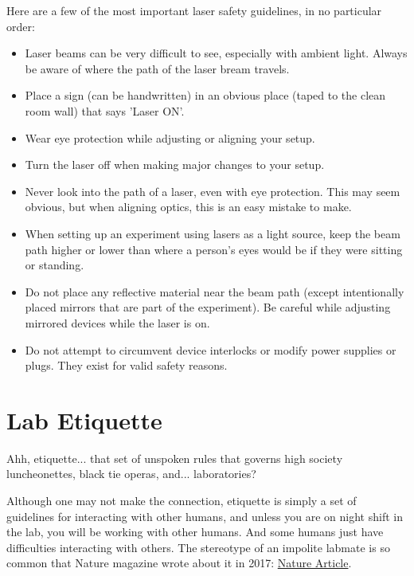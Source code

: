 \documentclass[11pt]{article}
\begin{document}
\vspace{.5cm}

\hspace{-0.6cm}Here are a few of the most important laser safety guidelines, in no particular order:

\begin{itemize}[noitemsep]
  \item Laser beams can be very difficult to see, especially with ambient light. Always be aware of where the path of the laser bream travels.
  \item Place a sign (can be handwritten) in an obvious place (taped to the clean room wall) that says 'Laser ON'.
  \item Wear eye protection while adjusting or aligning your setup.
  \item Turn the laser off when making major changes to your setup.
  \item Never look into the path of a laser, even with eye protection. This may seem obvious, but when aligning optics, this is an easy mistake to make.
  \item When setting up an experiment using lasers as a light source, keep the beam path higher or lower than where a person's eyes would be if they were sitting or standing.
  \item Do not place any reflective material near the beam path (except intentionally placed mirrors that are part of the experiment). Be careful while adjusting mirrored devices while the laser is on.
  \item Do not attempt to circumvent device interlocks or modify power supplies or plugs. They exist for valid safety reasons.

\end{itemize}


\section{Lab Etiquette}
\label{sec:Etiquette}

Ahh, etiquette... that set of unspoken rules that governs high society luncheonettes, black tie operas, and... laboratories?

Although one may not make the connection, etiquette is simply a set of guidelines for interacting with other humans, and unless you are on night shift in the lab, you will be working with other humans. And some humans just have difficulties interacting with others. The stereotype of an impolite labmate is so common that Nature magazine wrote about it in 2017: \href{https://www.nature.com/articles/nj7664-481a}{Nature Article}.
\end{document}

